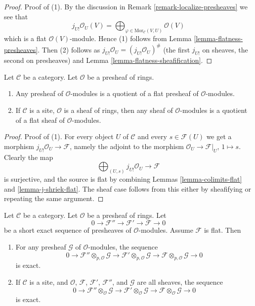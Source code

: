 \begin{proof}
Proof of (1). By the discussion in
Remark \ref{remark-localize-presheaves}
we see that
$$
j_{U!}\mathcal{O}_U(V)
=
\bigoplus\nolimits_{\varphi \in \text{Mor}_{\mathcal{C}}(V, U)}
\mathcal{O}(V)
$$
which is a flat $\mathcal{O}(V)$-module. Hence (1) follows from
Lemma \ref{lemma-flatness-presheaves}.
Then (2) follows as $j_{U!}\mathcal{O}_U = (j_{U!}\mathcal{O}_U)^\#$
(the first $j_{U!}$ on sheaves, the second on presheaves)
and Lemma \ref{lemma-flatness-sheafification}.
\end{proof}

\begin{lemma}
\label{lemma-module-quotient-flat}
Let $\mathcal{C}$ be a category.
Let $\mathcal{O}$ be a presheaf of rings.
\begin{enumerate}
\item Any presheaf of $\mathcal{O}$-modules is a quotient of
a flat presheaf of $\mathcal{O}$-modules.
\item If $\mathcal{C}$ is a site, $\mathcal{O}$ is a sheaf of rings,
then any sheaf of $\mathcal{O}$-modules is a quotient of
a flat sheaf of $\mathcal{O}$-modules.
\end{enumerate}
\end{lemma}

\begin{proof}
Proof of (1). For every object $U$ of $\mathcal{C}$ and every
$s \in \mathcal{F}(U)$ we get a morphism
$j_{U!}\mathcal{O}_U \to \mathcal{F}$, namely the adjoint to
the morphism $\mathcal{O}_U \to \mathcal{F}|_U$, $1 \mapsto s$.
Clearly the map
$$
\bigoplus\nolimits_{(U, s)} j_{U!}\mathcal{O}_U
\longrightarrow
\mathcal{F}
$$
is surjective, and the source is flat by combining Lemmas
\ref{lemma-colimits-flat} and \ref{lemma-j-shriek-flat}.
The sheaf case follows from this either by
sheafifying or repeating the same argument.
\end{proof}

\begin{lemma}
\label{lemma-flat-tor-zero}
Let $\mathcal{C}$ be a category.
Let $\mathcal{O}$ be a presheaf of rings.
Let
$$
0 \to \mathcal{F}'' \to \mathcal{F}' \to \mathcal{F} \to 0
$$
be a short exact sequence of presheaves of $\mathcal{O}$-modules.
Assume $\mathcal{F}$ is flat. Then
\begin{enumerate}
\item For any presheaf $\mathcal{G}$
of $\mathcal{O}$-modules, the sequence
$$
0 \to
\mathcal{F}'' \otimes_{p, \mathcal{O}} \mathcal{G} \to
\mathcal{F}' \otimes_{p, \mathcal{O}} \mathcal{G} \to
\mathcal{F} \otimes_{p, \mathcal{O}} \mathcal{G} \to 0
$$
is exact.
\item If $\mathcal{C}$ is a site, and $\mathcal{O}$,
$\mathcal{F}$, $\mathcal{F}'$, $\mathcal{F}''$, and
$\mathcal{G}$ are all sheaves, the sequence
$$
0 \to
\mathcal{F}'' \otimes_\mathcal{O} \mathcal{G} \to
\mathcal{F}' \otimes_\mathcal{O} \mathcal{G} \to
\mathcal{F} \otimes_\mathcal{O} \mathcal{G} \to 0
$$
is exact.
\end{enumerate}
\end{lemma}

